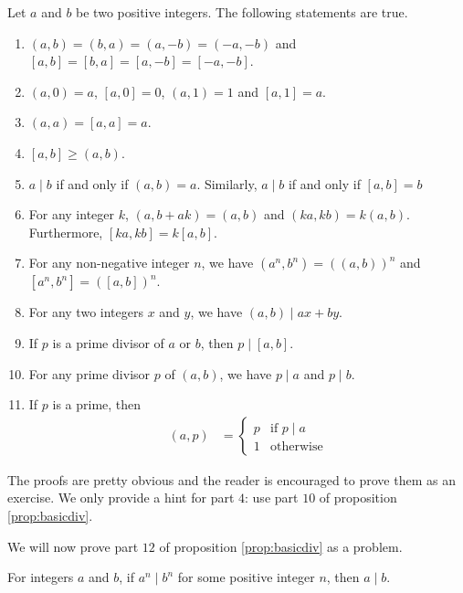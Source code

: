 \documentclass{subfile}
\begin{document}
	\begin{proposition}\label{prop:basicgcd}
		Let $a$ and $b$ be two positive integers. The following statements are true.
		\begin{enumerate}
			\item 	$(a, b) = (b, a) = (a, -b) = (-a, -b)$ and $[a, b]=[b, a] = [a, -b] = [-a, -b]$.
			\item 	$(a,0)=a$, $[a,0]=0$, $(a,1)=1$ and $[a,1]=a$.
			\item 	$(a,a)=[a,a] = a$.
			\item   $[a,b] \geq (a,b)$.
			\item	$a\mid b$ if and only if $(a,b)=a$. Similarly, $a\mid b$ if and only if $[a,b]=b$
			\item   For any integer $k$, $ (a, b+ak) = (a, b)$ and $(ka,kb)=k(a,b)$. Furthermore, $[ka,kb]=k[a,b]$.
			\item   For any non-negative integer $n$, we have $(a^n,b^n)=\left((a,b)\right)^n$ and $[a^n,b^n]=\left([a,b]\right)^n$.
			\item 	For any two integers $x$ and $y$, we have $(a,b)\mid ax+by$.
			\item 	If $p$ is a prime divisor of $a$ or $b$, then $p\mid [a,b]$.
			\item 	For any prime divisor $p$ of $(a, b)$, we have $p\mid a$ and $p\mid b$.
			\item 	If $p$ is a prime, then
			\begin{align*}
				(a,p) & =
				\begin{cases}
					p & \mbox{if } p\mid a\\
					1 & \mbox{otherwise}
				\end{cases}
			\end{align*}
		\end{enumerate}
	\end{proposition}

	The proofs are pretty obvious and the reader is encouraged to prove them as an exercise. We only provide a hint for part $4$: use part $10$ of proposition \eqref{prop:basicdiv}.

	We will now prove part $12$ of proposition \eqref{prop:basicdiv} as a problem.

	\begin{problem}
		For integers $a$ and $b$, if $a^n \mid b^n$ for some positive integer $n$, then $a\mid b$.
	\end{problem}
\end{document}
